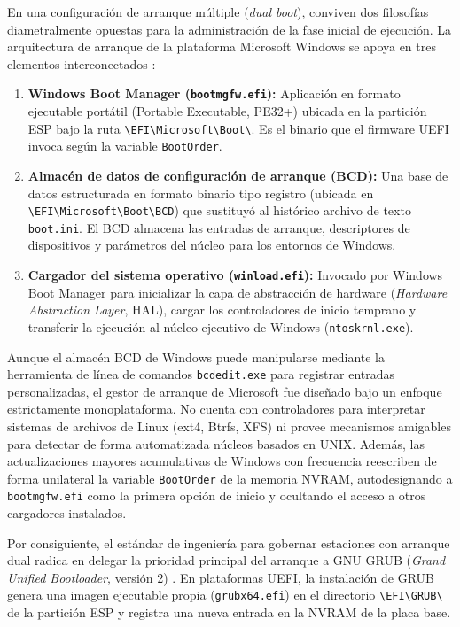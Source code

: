 \documentclass[12pt]{article}
\begin{document}
En una configuración de arranque múltiple (\textit{dual boot}), conviven dos filosofías diametralmente opuestas para la administración de la fase inicial de ejecución. La arquitectura de arranque de la plataforma Microsoft Windows se apoya en tres elementos interconectados \parencite{microsoft2024boot}:
\begin{enumerate}[noitemsep, topsep=2pt]
    \item \textbf{Windows Boot Manager (\texttt{bootmgfw.efi}):} Aplicación en formato ejecutable portátil (Portable Executable, PE32+) ubicada en la partición ESP bajo la ruta \texttt{\textbackslash EFI\textbackslash\allowbreak Microsoft\textbackslash\allowbreak Boot\textbackslash}. Es el binario que el firmware UEFI invoca según la variable \texttt{BootOrder}.
    \item \textbf{Almacén de datos de configuración de arranque (BCD):} Una base de datos estructurada en formato binario tipo registro (ubicada en \texttt{\textbackslash EFI\textbackslash Microsoft\textbackslash Boot\textbackslash BCD}) que sustituyó al histórico archivo de texto \texttt{boot.ini}. El BCD almacena las entradas de arranque, descriptores de dispositivos y parámetros del núcleo para los entornos de Windows.
    \item \textbf{Cargador del sistema operativo (\texttt{winload.efi}):} Invocado por Windows Boot Manager para inicializar la capa de abstracción de hardware (\textit{Hardware Abstraction Layer}, HAL), cargar los controladores de inicio temprano y transferir la ejecución al núcleo ejecutivo de Windows (\texttt{ntoskrnl.exe}).
\end{enumerate}

Aunque el almacén BCD de Windows puede manipularse mediante la herramienta de línea de comandos \texttt{bcdedit.exe} para registrar entradas personalizadas, el gestor de arranque de Microsoft fue diseñado bajo un enfoque estrictamente monoplataforma. No cuenta con controladores para interpretar sistemas de archivos de Linux (ext4, Btrfs, XFS) ni provee mecanismos amigables para detectar de forma automatizada núcleos basados en UNIX. Además, las actualizaciones mayores acumulativas de Windows con frecuencia reescriben de forma unilateral la variable \texttt{BootOrder} de la memoria NVRAM, autodesignando a \texttt{bootmgfw.efi} como la primera opción de inicio y ocultando el acceso a otros cargadores instalados.

Por consiguiente, el estándar de ingeniería para gobernar estaciones con arranque dual radica en delegar la prioridad principal del arranque a GNU GRUB (\textit{Grand Unified Bootloader}, versión 2) \parencite{gnugrub2024manual}. En plataformas UEFI, la instalación de GRUB genera una imagen ejecutable propia (\texttt{grubx64.efi}) en el directorio \texttt{\textbackslash EFI\textbackslash GRUB\textbackslash} de la partición ESP y registra una nueva entrada en la NVRAM de la placa base.
\end{document}
